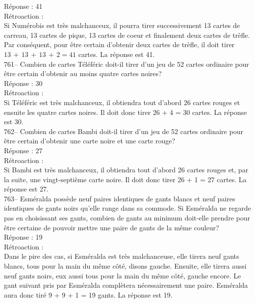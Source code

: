 ﻿\documentclass[letterpaper, 12pt]{article}
\begin{document}
R\'eponse : 41\\

R\'etroaction : \\
Si Num\'erobis est tr\`es malchanceux, il pourra tirer successivement 13
cartes de carreau, 13 cartes de pique, 13 cartes de coeur et finalement deux
cartes de tr\`efle.  Par cons\'equent, pour \^etre certain d'obtenir deux
cartes de tr\`efle, il doit tirer $13\,+\,13\,+\,13\,+\,2=41$ cartes.  La
r\'eponse est 41.\\

761-- Combien de cartes T\'el\'ef\'eric doit-il tirer d'un jeu de 52 cartes
ordinaire pour \^etre certain d'obtenir au moins quatre cartes noires?\\

R\'eponse : 30\\

R\'etroaction : \\
Si T\'el\'ef\'eric est tr\`es malchanceux, il obtiendra tout d'abord 26
cartes rouges et ensuite les quatre cartes noires.  Il doit donc tirer 26 +
4 = 30 cartes.  La r\'eponse est 30.\\

762-- Combien de cartes Bambi doit-il tirer d'un jeu de 52 cartes ordinaire
pour \^etre certain d'obtenir une carte noire et une carte rouge?\\

R\'eponse : 27\\

R\'etroaction : \\
Si Bambi est tr\`es malchanceux, il obtiendra tout d'abord 26 cartes rouges
et, par la suite, une vingt-septi\`eme carte noire.  Il doit donc tirer 26 +
1 = 27 cartes. La r\'eponse est 27.\\

763-- Esm\'eralda poss\`ede neuf paires identiques de gants blancs et neuf
paires identiques de gants noirs qu'elle range dans sa commode.  Si
Esm\'eralda ne regarde pas en choisissant ses gants, combien de gants au
minimum doit-elle prendre pour \^etre certaine de pouvoir mettre une paire
de gants de la m\^eme couleur?\\

R\'eponse : 19\\

R\'etroaction : \\
Dans le pire des cas, si Esm\'eralda est tr\`es malchanceuse, elle tirera
neuf gants blancs, tous pour la main du m\^eme c\^ot\'e, disons gauche.
Ensuite, elle tirera aussi neuf gants noirs, eux aussi tous pour la main du
m\^eme c\^ot\'e, gauche encore. Le gant suivant pris par Esm\'eralda
compl\`etera n\'ecessairement une paire. Esm\'eralda aura donc tir\'e 9 + 9
+ 1 = 19 gants.  La r\'eponse est 19.\\
\end{document}
